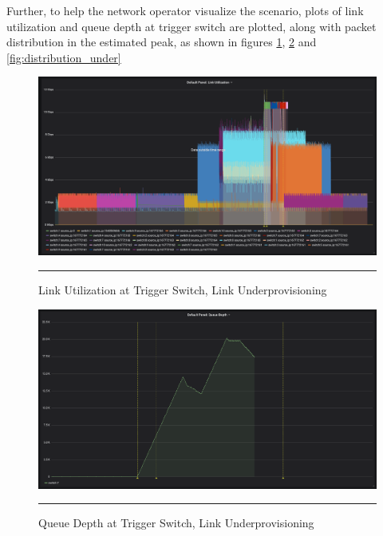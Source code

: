 Further, to help the network operator visualize the scenario, plots of link utilization and queue depth at 
trigger switch are plotted, along with packet distribution in the estimated peak, as shown in figures \ref{fig:link_utilization_under}, \ref{fig:queue_depth_under}
and \ref{fig:distribution_under}

\begin{figure}[htbp]
	\centering
		\includegraphics[width=1.0\columnwidth]{Figures/link_utilization_under.png}
		\rule{35em}{0.5pt}
	\caption[Link Utilization at Trigger Switch, Link Underprovisioning]{Link Utilization at Trigger Switch, Link Underprovisioning}
	\label{fig:link_utilization_under}
\end{figure}
\begin{figure}[htbp]
	\centering
		\includegraphics[width=1.0\columnwidth]{Figures/queue_depth_under.png}
		\rule{35em}{0.5pt}
	\caption[Queue Depth at Trigger Switch, Link Underprovisioning]{Queue Depth at Trigger Switch, Link Underprovisioning}
	\label{fig:queue_depth_under}
\end{figure}
